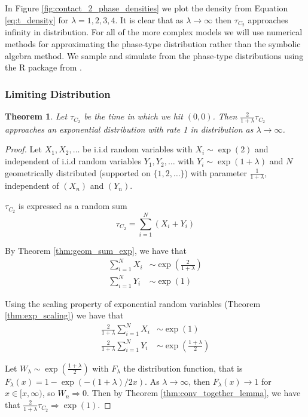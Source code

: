 \documentclass{article}
\theoremstyle{plain}
\newtheorem{theorem}{Theorem}[section]
\theoremstyle{definition}
\theoremstyle{remark}
\numberwithin{equation}{section}
\begin{document}
In Figure \ref{fig:contact_2_phase_densities} we plot the density from Equation \ref{eq:t_density} for $\lambda = 1, 2, 3, 4$.
It is clear that as $\lambda \to \infty$ then $\tau_{C_2}$ approaches infinity in distribution.
For all of the more complex models we will use numerical methods for approximating the phase-type distribution rather than the symbolic algebra method.
We sample and simulate from the phase-type distributions using the R package from \cite{actuar2008}.

\subsubsection{Limiting Distribution}

\begin{theorem}
Let $\tau_{C_2}$ be the time in which we hit $(0,0)$.
Then $\frac{2}{1 + \lambda} \tau_{C_2}$ approaches an exponential distribution with rate 1 in distribution as $\lambda \to \infty$.
\end{theorem}

\begin{proof}
Let $X_1, X_2, \ldots$ be i.i.d random variables with
$X_i \sim \exp(2)$ and independent of i.i.d random variables $Y_1, Y_2, \ldots$ with  $Y_i \sim \exp(1 + \lambda)$ and
$N$ geometrically distributed (supported on $\{1,2,\ldots\}$) with parameter $\frac{1}{1 + \lambda}$, independent of $(X_n)$ and $(Y_n)$.

$\tau_{C_2}$ is expressed as a random sum
$$
\tau_{C_2} = \sum_{i = 1}^N (X_i + Y_i)
$$

By Theorem \ref{thm:geom_sum_exp}, we have that
\begin{align*}
    \sum_{i = 1}^N X_i &\sim \exp\left( \frac{2}{1 + \lambda} \right)\\
    \sum_{i = 1}^N Y_i &\sim \exp( 1 )
\end{align*}

Using the scaling property of exponential random variables (Theorem \ref{thm:exp_scaling}) we have that
\begin{align*}
    \frac{2}{1 + \lambda}\sum_{i = 1}^N X_i &\sim \exp( 1 )\\
    \frac{2}{1 + \lambda}\sum_{i = 1}^N Y_i &\sim \exp \left( \frac{1 + \lambda}{2} \right)
\end{align*}

Let $W_\lambda \sim \exp \left( \frac{1 + \lambda}{2} \right)$ with $F_\lambda$ the distribution function, that is $F_\lambda(x) = 1 - \exp(-(1 + \lambda)/2 x)$.
As $\lambda \to \infty$, then $F_\lambda(x) \to 1$ for $x \in [x, \infty)$, so $W_n \Rightarrow 0$.
Then by Theorem \ref{thm:conv_together_lemma}, we have that $\frac{2}{1 + \lambda} \tau_{C_2} \Rightarrow \exp(1)$.
\end{proof}
\end{document}

